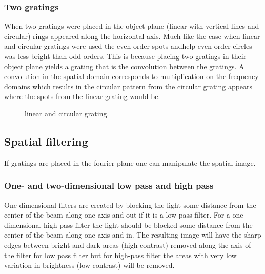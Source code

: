 \documentclass[12pt,a4paper]{article}
\begin{document}
\subsubsection{Two gratings}
When two gratings were placed in the object plane (linear with vertical lines and circular) rings appeared along the horizontal axis. Much like the case when linear and circular gratings were used the even order spots andhelp even order circles was less bright than odd orders. This is because placing two gratings in their object plane yields a grating that is the convolution between the gratings. A convolution in the spatial domain corresponds to multiplication on the frequency domains which results in the circular pattern from the circular grating appears where the spots from the linear grating would be.
\begin{figure}
  \centering
  \noindent\makebox[\textwidth]{\scalebox{0.70}{}}
  \caption{linear and circular grating.}
  \label{fig:lin_circ_grating}
\end{figure}

\subsection{Spatial filtering}
If gratings are placed in the fourier plane one can manipulate the spatial image.

\subsubsection{One- and two-dimensional low pass and high pass}
One-dimensional filters are created by blocking the light some distance from the center of the beam along one axis and out if it is a low pass filter. For a one-dimensional high-pass filter the light should be blocked some distance from the center of the beam along one axis and in.
The resulting image will have the sharp edges between bright and dark areas (high contrast) removed along the axis of the filter for low pass filter but for high-pass filter the areas with very low variation in brightness (low contrast) will be removed.
\end{document}
